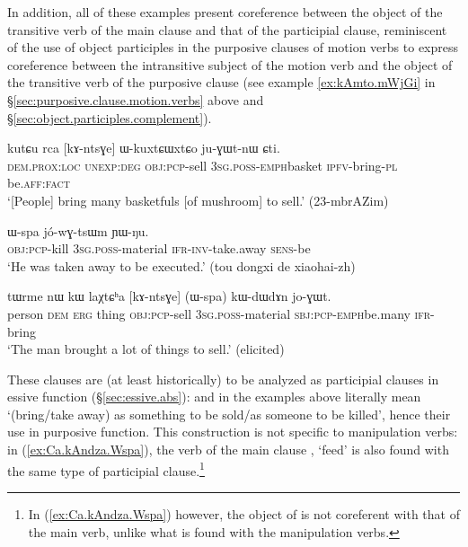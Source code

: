 In addition, all of these examples present coreference between the object of the transitive verb of the main clause and that of the participial clause, reminiscent of the use of object participles in the purposive clauses of motion verbs to express coreference between the intransitive subject of the motion verb and the object of the transitive verb of the purposive clause (see example \ref{ex:kAmto.mWjGi} in §\ref{sec:purposive.clause.motion.verbs} above and §\ref{sec:object.participles.complement}).


\begin{exe}
	\ex \label{ex:kAntsGe.WkuxtCWxtCo}
	\gll  kutɕu rca [kɤ-ntsɣe] ɯ-kuxtɕɯ\redp{}xtɕo ju-ɣɯt-nɯ ɕti. \\
	\textsc{dem}.\textsc{prox}:\textsc{loc} \textsc{unexp}:\textsc{deg} \textsc{obj}:\textsc{pcp}-sell \textsc{3sg}.\textsc{poss}-\textsc{emph}\redp{}basket \textsc{ipfv}-bring-\textsc{pl} be.\textsc{aff}:\textsc{fact} \\
	\glt `[People] bring many basketfuls [of mushroom] to sell.' (23-mbrAZim)
\end{exe}

\begin{exe}
	\ex \label{ex:kAsat.Wspa.jowGtsWm}
	\gll [kɤ-sat] ɯ-spa jó-wɣ-tsɯm ɲɯ-ŋu. \\
	\textsc{obj}:\textsc{pcp}-kill \textsc{3sg}.\textsc{poss}-material \textsc{ifr}-\textsc{inv}-take.away \textsc{sens}-be  \\
	\glt `He was taken away to be executed.' (tou dongxi de xiaohai-zh)
\end{exe}

\begin{exe}
	\ex \label{ex:kAntsGe.Wspa.joGWt}
	\gll tɯrme nɯ kɯ laχtɕʰa [kɤ-ntsɣe] (ɯ-spa) kɯ-dɯ\redp{}dɤn jo-ɣɯt. \\
	person \textsc{dem} \textsc{erg} thing \textsc{obj}:\textsc{pcp}-sell \textsc{3sg}.\textsc{poss}-material \textsc{sbj}:\textsc{pcp}-\textsc{emph}\redp{}be.many \textsc{ifr}-bring \\
	\glt `The man brought a lot of things to sell.' (elicited)
\end{exe}

These clauses are (at least historically) to be analyzed as participial clauses in essive function (§\ref{sec:essive.abs}):  and  in the examples above literally mean `(bring/take away) as something to be sold/as someone to be killed', hence their use in purposive function. This construction is not specific to manipulation verbs: in (\ref{ex:Ca.kAndza.Wspa}), the verb of the main clause , `feed' is also found with the same type of participial clause.\footnote{In (\ref{ex:Ca.kAndza.Wspa}) however, the object of  is not coreferent with that of the main verb, unlike what is found with the manipulation verbs. }

